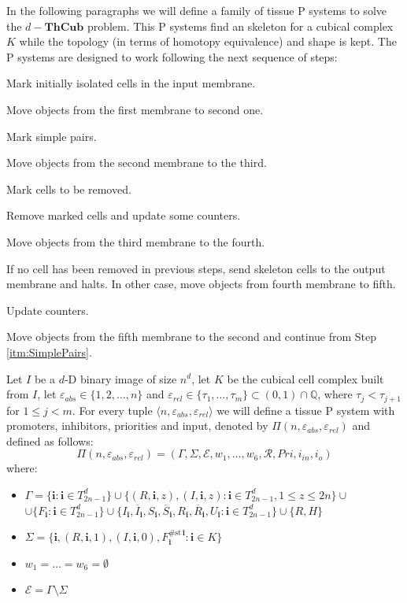 \documentclass[journal]{IEEEtran}
\begin{document}
In the following paragraphs we will define a family of tissue P systems to solve the 
$d-\mathbf{ThCub}$ problem. This P systems find an skeleton for a cubical complex $K$
while the topology (in terms of homotopy equivalence) and shape is kept. The P systems
are designed to work following the next sequence of steps:
\begin{list}{Step :}{}
\item Mark initially isolated cells in the input membrane.
\item Move objects from the first membrane to second one.
\item Mark simple pairs. \label{itm:SimplePairs}
\item Move objects from the second membrane to the third.
\item Mark cells to be removed.
\item Remove marked cells and update some counters.
\item Move objects from the third membrane to the fourth.
\item If no cell has been removed in previous steps, send skeleton cells to the output 
membrane and halts. In other case, move objects from fourth membrane to fifth.
\item Update counters.
\item Move objects from the fifth membrane to the second and continue from Step \ref{itm:SimplePairs}.
\end{list}
Let $I$ be a $d$-D binary image of size $n^d$, let $K$ be the cubical cell complex built
from $I$, let $\varepsilon_{abs} \in \{1, 2, \ldots, n\}$ and $\varepsilon_{rel}
\in \{\tau_1, \ldots, \tau_m\} \subset (0,1) \cap \mathbb{Q}$, where $\tau_j <
\tau_{j+1}$ for $1 \leq j < m$. For every tuple $\langle n, \varepsilon_{abs},
\varepsilon_{rel} \rangle$ we will define a tissue P system with promoters,
inhibitors, priorities and input, denoted by $\Pi(n, \varepsilon_{abs},
\varepsilon_{rel})$ and defined as follows:
$$
 \Pi(n, \varepsilon_{abs}, \varepsilon_{rel}) =
 (\Gamma,\Sigma,\mathcal{E},w_1,\dots,w_6,\mathcal{R},Pri,i_{in},i_o)
$$
where:
\begin{itemize}
    \item $\Gamma = \{\mathbf{i}: \mathbf{i} \in T_{2n-1}^d\} \cup \{(R,
    \mathbf{i}, z), (I, \mathbf{i}, z): \mathbf{i} \in T_{2n-1}^d, 1 \leq z \leq
    2n\}\cup$ \newline $\cup\{F_\mathbf{i}:\mathbf{i} \in
    T_{2n-1}^d\}\cup\{I_\mathbf{i}, \overline{I}_\mathbf{i}, S_\mathbf{i},
    \overline{S}_\mathbf{i}, R_\mathbf{i}, \overline{R}_\mathbf{i}, U_\mathbf{i}:
    \mathbf{i} \in T_{2n-1}^d\} \cup \{R, H\}$
    \item $\Sigma =
    \{\mathbf{i},(R,\mathbf{i},1),(I,\mathbf{i},0),F_\mathbf{i}^{\#\mathrm{st}\,\mathbf{i}}:
    \mathbf{i} \in K\}$
    \item $w_1 = \ldots = w_6 = \emptyset$
    \item $\mathcal{E} = \Gamma \setminus \Sigma$
\end{itemize}
\end{document}
